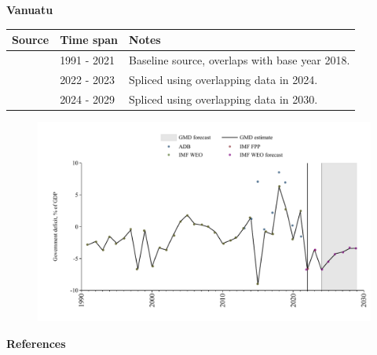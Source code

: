 \documentclass[12pt,a4paper,landscape]{article}
\begin{document}
\begin{adjustbox}{max totalsize={\paperwidth}{\paperheight},center}
\begin{minipage}[t][\textheight][t]{\textwidth}
\vspace*{0.5cm}
{}
\begin{center}
{\Large\bfseries Vanuatu}
\end{center}
\vspace{0.5cm}
\begin{table}[H]
\centering
\small
\begin{tabular}{|l|l|l|}
\hline
\textbf{Source} & \textbf{Time span} & \textbf{Notes} \\
\hline
\rowcolor{white}\cite{IMF_WEO}& 1991 - 2021 &Baseline source, overlaps with base year 2018.\\
\rowcolor{lightgray}\cite{IMF_FPP}& 2022 - 2023 &Spliced using overlapping data in 2024.\\
\rowcolor{white}\cite{IMF_WEO_forecast}& 2024 - 2029 &Spliced using overlapping data in 2030.\\
\hline
\end{tabular}
\end{table}
\begin{figure}[H]
\centering
\includegraphics[width=\textwidth,height=0.6\textheight,keepaspectratio]{graphs/VUT_govdef_GDP.pdf}
\end{figure}
\end{minipage}
\end{adjustbox}
{}
\begin{center}
{\Large\bfseries References}
\end{center}
\small


\end{document}
